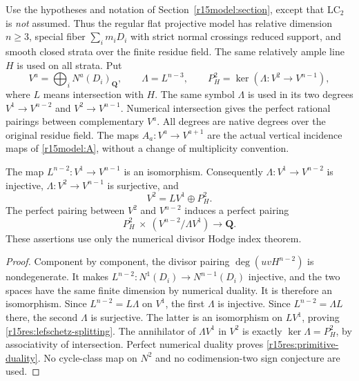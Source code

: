 Use the hypotheses and notation of
Section~\ref{r15model:section}, except that
$\mathrm{LC}_2$ is \emph{not} assumed.  Thus the regular flat
projective model has relative dimension $n\geq3$, special
fiber $\sum_i m_iD_i$ with strict normal crossings reduced
support, and smooth closed strata over the finite residue
field.  The same relatively ample line $H$ is used on all
strata.  Put
\[
 V^a=\bigoplus_i N^a(D_i)_{\mathbf Q},\qquad
 \Lambda=L^{n-3},\qquad
 P_H^2=\ker(\Lambda:V^2\longrightarrow V^{n-1}),
\tag{NR15.1}\label{r15res:primitive-space}
\]
where $L$ means intersection with $H$.  The same symbol
$\Lambda$ is used in its two degrees
$V^1\to V^{n-2}$ and $V^2\to V^{n-1}$.
Numerical intersection gives the perfect rational pairings
between complementary $V^a$.  All degrees are native degrees
over the original residue field.  The maps
$A_a:V^a\to V^{a+1}$ are the actual vertical incidence maps
of \eqref{r15model:A}, without a change of multiplicity convention.

\begin{lemma}
\label{r15res:divisor-linear-algebra}
The map $L^{n-2}:V^1\to V^{n-1}$ is an isomorphism.
Consequently $\Lambda:V^1\to V^{n-2}$ is injective,
$\Lambda:V^2\to V^{n-1}$ is surjective, and
\[
                    V^2=L V^1\oplus P_H^2.
\tag{NR15.2}\label{r15res:lefschetz-splitting}
\]
The perfect pairing between $V^2$ and $V^{n-2}$ induces a
perfect pairing
\[
            P_H^2\ \times\ (V^{n-2}/\Lambda V^1)
                                          \longrightarrow\mathbf Q.
\tag{NR15.3}\label{r15res:primitive-duality}
\]
These assertions use only the numerical divisor Hodge index theorem.
\end{lemma}

\begin{proof}
Component by component, the divisor pairing
$\deg(u v H^{n-2})$ is nondegenerate.  It makes
$L^{n-2}:N^1(D_i)\to N^{n-1}(D_i)$ injective, and the two
spaces have the same finite dimension by numerical duality.
It is therefore an isomorphism.
Since $L^{n-2}=L\Lambda$ on $V^1$, the first $\Lambda$ is
injective.  Since $L^{n-2}=\Lambda L$ there, the second
$\Lambda$ is surjective.  The latter is an isomorphism on
$L V^1$, proving \eqref{r15res:lefschetz-splitting}.
The annihilator of $\Lambda V^1$ in $V^2$ is exactly
$\ker\Lambda=P_H^2$, by associativity of intersection.
Perfect numerical duality proves \eqref{r15res:primitive-duality}.
No cycle-class map on $N^2$ and no codimension-two sign
conjecture are used.
\end{proof}

